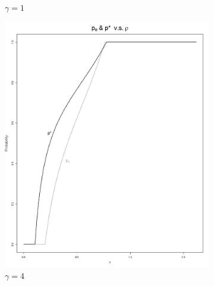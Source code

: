 \documentclass[11pt]{article}
\numberwithin{equation}{section}
\begin{document}
\begin{figure}[h!]
\begin{subfigure}[b]{0.49\textwidth}
		\caption{$\gamma=1$}
	\end{subfigure}
	\begin{subfigure}[b]{0.49\textwidth}
	\includegraphics[width=\textwidth]{plots/pe_vs_pstar_4.png}
		\caption{$\gamma=4$}
	\end{subfigure}
	\begin{subfigure}[b]{0.49\textwidth}

\end{subfigure}
\end{figure}
\end{document}
